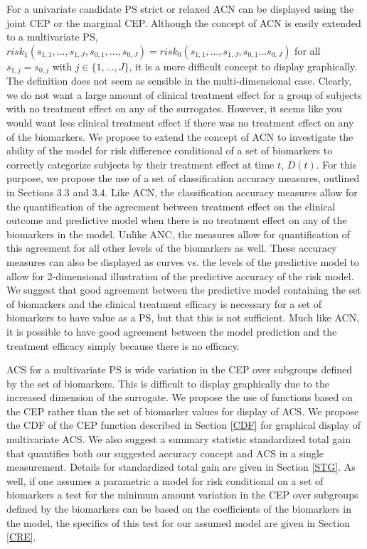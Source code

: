 \documentclass[times, doublespace]{simauth}
\begin{document}
For a univariate candidate PS strict or relaxed ACN can be displayed using the joint CEP or the marginal CEP.  Although the concept of ACN is easily extended to a multivariate PS, $risk_1(s_{1,1}, \dots, s_{1,J} ,s_{0,1}, \dots, s_{0,J})=risk_0(s_{1,1}, \dots, s_{1,J} ,s_{0,1} \dots s_{0,J})$ for all $s_{1,j} = s_{0,j}$ with $j \in \{1, \dots, J\}$, it is a more difficult concept to display graphically. The definition does not seem as sensible in the multi-dimensional case. Clearly, we do not want a large amount of clinical treatment effect for a group of subjects with no treatment effect on any of the surrogates. However, it seems like you would want less clinical treatment effect if there was no treatment effect on any of the biomarkers.  We propose to extend the concept of ACN to investigate the ability of the model for risk difference conditional of a set of biomarkers to correctly categorize subjects by their treatment effect at time $t$, $D(t)$. For this purpose, we propose the use of a set of classification accuracy measures, outlined in Sections 3.3 and 3.4. Like ACN, the classification accuracy measures allow for the quantification of the agreement between treatment effect on the clinical outcome and predictive model when there is no treatment effect on any of the biomarkers in the model.  Unlike ANC, the measures allow for quantification of this agreement for all other levels of the biomarkers as well.  These accuracy measures can also be displayed as curves vs. the levels of the predictive model to allow for 2-dimensional  illustration of the predictive accuracy of the risk model. We suggest that good agreement between the predictive model containing the set of biomarkers and the clinical treatment efficacy is necessary for a set of biomarkers to have value as a PS, but that this is not sufficient. Much like ACN, it is possible to have good agreement between the model prediction and the treatment efficacy simply because there is no efficacy. 


ACS for a multivariate PS is wide variation in the CEP over subgroups defined by the set of biomarkers. This is difficult to display graphically due to the increased dimension of the surrogate. We propose the use of functions based on the CEP rather than the set of biomarker values for display of ACS. We propose the CDF of the CEP function described in Section \ref{CDF} for graphical display of multivariate ACS. We also suggest a summary statistic standardized total gain that quantifies both our suggested accuracy concept and ACS in a single measurement. Details for standardized total gain are given in Section \ref{STG}.  As well, if one assumes a parametric a model for risk conditional on a set of biomarkers a test for the minimum amount variation in the CEP over subgroups defined by the biomarkers can be based on the coefficients of the biomarkers in the model, the specifics of this test for our assumed model are given in Section \ref{CRE}.
\end{document}
